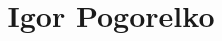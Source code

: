 \documentclass[letterpaper]{article}
\begin{document}
\title{Igor Pogorelko}
\maketitle
\end{document}
